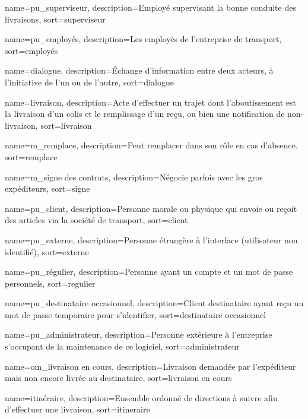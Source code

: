 {
	name={pu\_superviseur},
	description={Employé supervisant la bonne conduite des livraisons},
	sort={superviseur}
}

{
	name={pu\_employés},
	description={Les employés de l'entreprise de transport},
	sort={employés}
}

{
	name={dialogue},
	description={Échange d'information entre deux acteurs, à l'initiative de l'un ou de l'autre},
	sort={dialogue}
}

{
	name={livraison},
	description={Acte d'effectuer un trajet dont l'aboutissement est la livraison d'un colis et le remplissage d'un reçu, ou bien une notification de non-livraison},
	sort={livraison}
}

{
	name={m\_remplace},
	description={Peut remplacer dans son rôle en cas d'absence},
	sort={remplace}
}

{
	name={m\_signe des contrats},
	description={Négocie parfois avec les gros expéditeurs},
	sort={signe}
}

{
	name={pu\_client},
	description={Personne morale ou physique qui envoie ou reçoit des articles via la société de transport},
	sort={client}
}

{
	name={pu\_externe},
	description={Personne étrangère à l'interface (utilisateur non identifié)},
	sort={externe}
}

{
	name={pu\_régulier},
	description={Personne ayant un compte et un mot de passe personnels},
	sort={regulier}
}

{
	name={pu\_destinataire occasionnel},
	description={Client destinataire ayant reçu un mot de passe temporaire pour s'identifier},
	sort={destinataire occasionnel}
}

{
	name={pu\_administrateur},
	description={Personne extérieure à l'entreprise s'occupant de la maintenance de ce logiciel},
	sort={administrateur}
}

{
	name={om\_livraison en cours},
	description={Livraison demandée par l'expéditeur mais non encore livrée au destinataire},
	sort={livraison en cours}
}

{
	name={itinéraire},
	description={Ensemble ordonné de directions à suivre afin d'effectuer une livraison},
	sort={itineraire}
}

